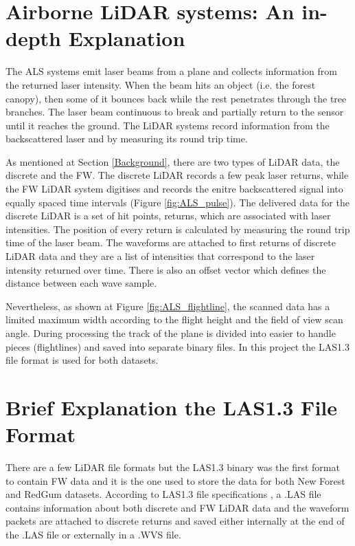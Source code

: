 \documentclass{subfiles}
\begin{document}
    \section{Airborne LiDAR systems: An in-depth Explanation}\label{sec:ALS}
     
        
    
    The ALS systems emit laser beams from a plane and collects information from the  returned laser intensity. When the beam hits an object (i.e. the forest canopy), then some of it bounces back while the rest penetrates through the tree branches. The laser beam continuous to break and partially return to the sensor until it reaches the ground. The LiDAR systems record information from the backscattered laser and by measuring its round trip time. 

     
     As mentioned at Section \ref{Background}, there are two types of LiDAR data, the discrete and the FW. The discrete LiDAR records a few peak laser returns, while the FW LiDAR system digitises and records the enitre backscattered signal into equally spaced time intervals (Figure \ref{fig:ALS_pulse}). The delivered data for the discrete LiDAR is a set of hit points, returns, which are associated with laser intensities. The position of every return is calculated by measuring the round trip time of the laser beam. The waveforms are attached to first returns of discrete LiDAR data and they are a list of intensities that correspond to the laser intensity returned over time. There is also an offset vector which defines the distance between each wave sample.
     
    Nevertheless, as shown at Figure \ref{fig:ALS_flightline}, the scanned data has a limited maximum width according to the flight height and the field of view scan angle. During processing the track of the plane is divided into easier to handle pieces (flightlines) and saved into separate binary files. In this project the LAS1.3 file format is used for both datasets. 
      
     
    \section{ Brief Explanation the LAS1.3 File Format} \label{sec:LAS1_3_specifications}
    
    \par There are a few LiDAR file formats but the LAS1.3 binary was the first format to contain FW data and it is the one used to store the data for both  New Forest and RedGum datasets. According to LAS1.3 file specifications \cite{LAS1.3specifications}, a .LAS file contains information about both discrete and FW LiDAR data and the waveform packets are attached to discrete returns and saved either internally at the end of the .LAS file or externally in a .WVS file. 
    
\end{document}

